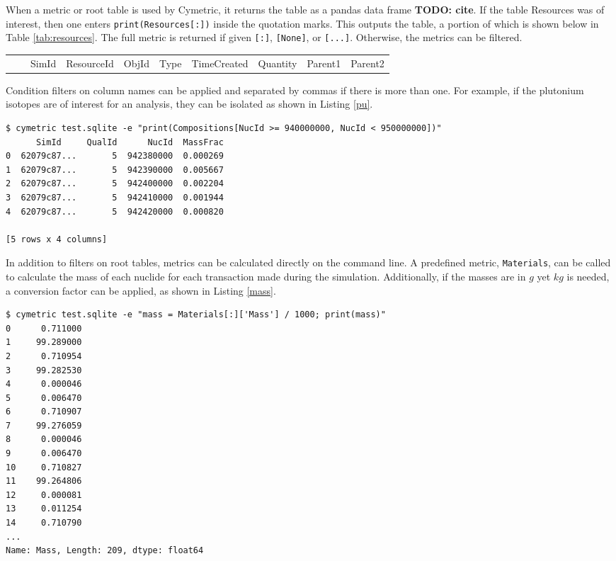 \documentclass{anstrans}
\newcommand{\cyclus}{\textsc{Cyclus}\xspace}
\newcommand{\TODO}[1] {{\color{red}\textbf{TODO: #1}}}
\newcommand{\code}[1]{{\color{code}\texttt{#1}}}
\begin{document}
When a metric or root table is used by Cymetric, it returns the table as a pandas data frame \TODO{cite}. If the table Resources was of interest, then one enters \code{print(Resources[:])} inside the quotation marks. This outputs the table, a portion of which is shown below in Table \ref{tab:resources}. The full metric is returned if given \code{[:]}, \code{[None]}, or \code{[...]}. Otherwise, the metrics can be filtered.

\begin{table*}[htb]
  \centering
\begin{tabular}{llllllllll}
      &       & SimId      & ResourceId      &
      ObjId      & Type      & TimeCreated      & Quantity      &
      Parent1      & Parent2
\\
\end{tabular}
  \caption{The Resources table in the \cyclus database.}
  \label{tab:resources}
\end{table*}

Condition filters on column names can be applied and separated by commas if there is more than one. For example, if the plutonium isotopes are of interest for an analysis, they can be isolated as shown in Listing \ref{pu}. 

\begin{lstlisting}[caption ={Filtering a Root Table in a Database}, label=pu]
 $ cymetric test.sqlite -e "print(Compositions[NucId >= 940000000, NucId < 950000000])"
      SimId     QualId      NucId  MassFrac
0  62079c87...       5  942380000  0.000269
1  62079c87...       5  942390000  0.005667
2  62079c87...       5  942400000  0.002204
3  62079c87...       5  942410000  0.001944
4  62079c87...       5  942420000  0.000820

[5 rows x 4 columns]
\end{lstlisting}

In addition to filters on root tables, metrics can  be calculated directly on the command line. A predefined metric, \code{Materials}, can be called to calculate the mass of each nuclide for each transaction made during the simulation. Additionally, if the masses are in $g$ yet $kg$ is needed, a conversion factor can be applied, as shown in Listing \ref{mass}.

\begin{lstlisting}[caption ={Calculating and Manipulating Metrics}, label=mass]
$ cymetric test.sqlite -e "mass = Materials[:]['Mass'] / 1000; print(mass)"
0      0.711000
1     99.289000
2      0.710954
3     99.282530
4      0.000046
5      0.006470
6      0.710907
7     99.276059
8      0.000046
9      0.006470
10     0.710827
11    99.264806
12     0.000081
13     0.011254
14     0.710790
...
Name: Mass, Length: 209, dtype: float64
\end{lstlisting}
\end{document}
